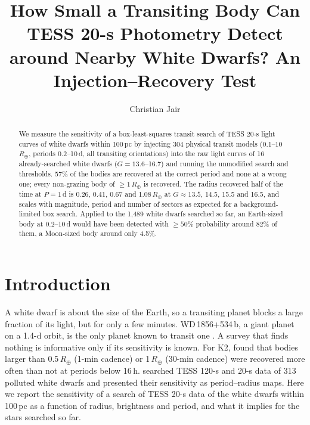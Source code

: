 \documentclass[RNAAS]{aastex631}
\begin{document}
\title{How Small a Transiting Body Can TESS 20-s Photometry Detect around Nearby White Dwarfs? An Injection--Recovery Test}

\author{Christian Jair}

\begin{abstract}
We measure the sensitivity of a box-least-squares transit search of TESS 20-s light curves of white dwarfs within
100\,pc by injecting 304 physical transit models (0.1--10\,$R_\oplus$, periods 0.2--10\,d, all transiting
orientations) into the raw light curves of 16 already-searched white dwarfs ($G=13.6$--16.7) and running the
unmodified search and thresholds. 57\% of the bodies are recovered at the correct period and none at a wrong one;
every non-grazing body of $\geq1\,R_\oplus$ is recovered. The radius recovered half of the time at $P=1$\,d is 0.26,
0.41, 0.67 and 1.08\,$R_\oplus$ at $G\approx13.5$, 14.5, 15.5 and 16.5, and scales with magnitude, period and number of
sectors as expected for a background-limited box search. Applied to the 1,489 white dwarfs searched so far, an
Earth-sized body at 0.2--10\,d would have been detected with $\geq50\%$ probability around 82\% of them, a Moon-sized
body around only 4.5\%.
\end{abstract}


\section{Introduction}
A white dwarf is about the size of the Earth, so a transiting planet blocks a large fraction of its light, but for
only a few minutes. WD\,1856+534\,b, a giant planet on a 1.4-d orbit, is the only planet known to transit one
\citep{vanderburg2020}. A survey that finds nothing is informative only if its sensitivity is known. For K2,
\citet{vansluijs2018} found that bodies larger than 0.5\,$R_\oplus$ (1-min cadence) or 1\,$R_\oplus$ (30-min cadence)
were recovered more often than not at periods below 16\,h. \citet{robert2024} searched TESS 120-s and 20-s data of
313 polluted white dwarfs and presented their sensitivity as period--radius maps. Here we report the sensitivity of
a search of TESS 20-s data of the white dwarfs within 100\,pc as a function of radius, brightness and period, and
what it implies for the stars searched so far.
\end{document}
